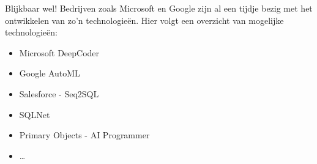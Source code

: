 Blijkbaar wel! Bedrijven zoals Microsoft en Google zijn al een tijdje bezig met het ontwikkelen van zo'n technologieën. Hier volgt een overzicht van mogelijke technologieën:
\begin{itemize}
	\item Microsoft DeepCoder
	\item Google AutoML
	\item Salesforce - Seq2SQL
	\item SQLNet
	\item Primary Objects - AI Programmer
	\item \ldots
\end{itemize}

\lipsum[7-20]